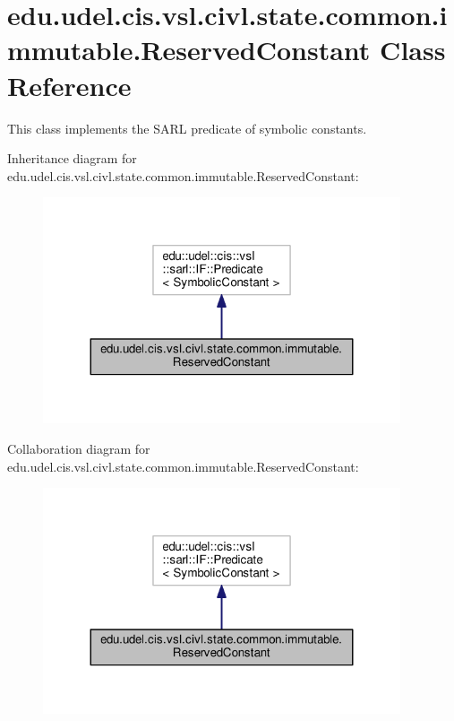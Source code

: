 \hypertarget{classedu_1_1udel_1_1cis_1_1vsl_1_1civl_1_1state_1_1common_1_1immutable_1_1ReservedConstant}{}\section{edu.\+udel.\+cis.\+vsl.\+civl.\+state.\+common.\+immutable.\+Reserved\+Constant Class Reference}
\label{classedu_1_1udel_1_1cis_1_1vsl_1_1civl_1_1state_1_1common_1_1immutable_1_1ReservedConstant}


This class implements the S\+A\+R\+L predicate of symbolic constants.  




Inheritance diagram for edu.\+udel.\+cis.\+vsl.\+civl.\+state.\+common.\+immutable.\+Reserved\+Constant\+:
\nopagebreak
\begin{figure}[H]
\begin{center}
\leavevmode
\includegraphics[width=299pt]{classedu_1_1udel_1_1cis_1_1vsl_1_1civl_1_1state_1_1common_1_1immutable_1_1ReservedConstant__inherit__graph}
\end{center}
\end{figure}


Collaboration diagram for edu.\+udel.\+cis.\+vsl.\+civl.\+state.\+common.\+immutable.\+Reserved\+Constant\+:
\nopagebreak
\begin{figure}[H]
\begin{center}
\leavevmode
\includegraphics[width=299pt]{classedu_1_1udel_1_1cis_1_1vsl_1_1civl_1_1state_1_1common_1_1immutable_1_1ReservedConstant__coll__graph}
\end{center}
\end{figure}
